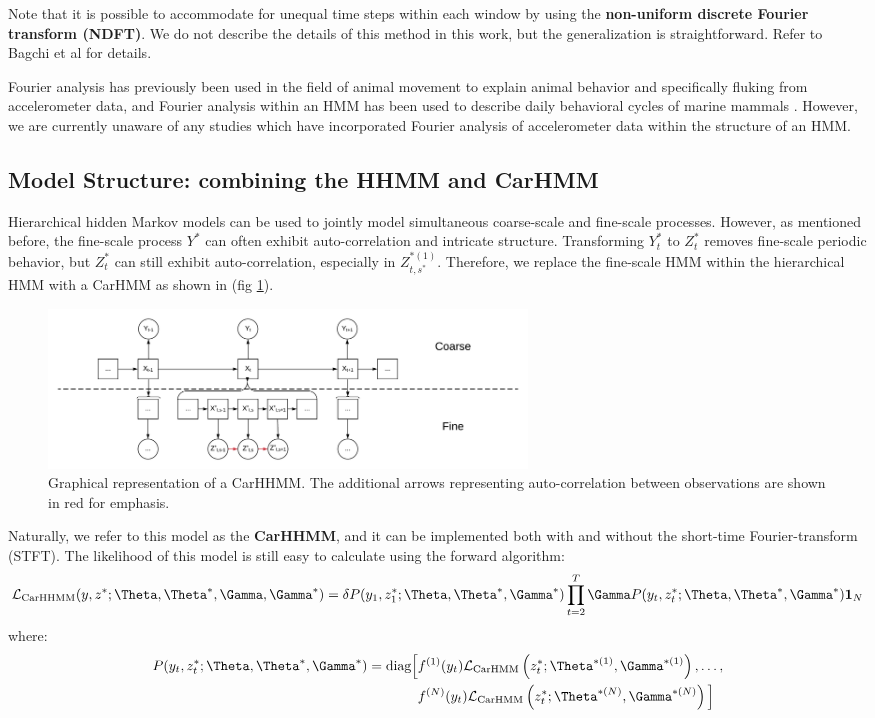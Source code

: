 Note that it is possible to accommodate for unequal time steps within each window by using the \textbf{non-uniform discrete Fourier transform (NDFT)}. We do not describe the details of this method in this work, but the generalization is straightforward. Refer to Bagchi et al \cite{Bagchi:2001} for details.

Fourier analysis has previously been used in the field of animal movement to explain animal behavior \cite{Fehlmann:2017} and specifically fluking \cite{Shorter:2017} from accelerometer data, and Fourier analysis within an HMM has been used to describe daily behavioral cycles of marine mammals  \cite{Heerah:2017}. However, we are currently unaware of any studies which have incorporated Fourier analysis of accelerometer data within the structure of an HMM.

\subsection{Model Structure: combining the HHMM and CarHMM}

Hierarchical hidden Markov models can be used to jointly model simultaneous coarse-scale and fine-scale processes. However, as mentioned before, the fine-scale process $Y^*$ can often exhibit auto-correlation and intricate structure. Transforming $Y^*_t$ to $Z^*_t$ removes fine-scale periodic behavior, but $Z^*_t$ can still exhibit auto-correlation, especially in $Z_{t,s^*}^{*(1)}$. Therefore, we replace the fine-scale HMM within the hierarchical HMM with a CarHMM as shown in (fig \ref{fig:CarHHMM}).
%
\begin{figure}[h!]
	\centering
	\includegraphics[width=5in]{../Plots/CarHHMM.png}
	\caption{Graphical representation of a CarHHMM. The additional arrows representing auto-correlation between observations are shown in red for emphasis.}
	\label{fig:CarHHMM}
\end{figure}
%
Naturally, we refer to this model as the \textbf{CarHHMM}, and it can be implemented both with and without the short-time Fourier-transform (STFT). The likelihood of this model is still easy to calculate using the forward algorithm:
%
$$\calL_{\text{CarHHMM}}(y,z^*;\Theta,\Theta^*,\Gamma,\Gamma^*) = \delta P(y_1,z_1^*;\Theta,\Theta^*,\Gamma^*) \prod_{t=2}^T \Gamma P(y_t,z_t^*;\Theta,\Theta^*,\Gamma^*) \mathbf{1}_N$$
%
where:
%
\begin{align*}
P(y_t,z_t^*;\Theta,\Theta^*,\Gamma^*)  = \text{diag}\Big[&f^{(1)}(y_t)\calL_{\text{CarHMM}}\left(z_t^*;\Theta^{*(1)},\Gamma^{*(1)}\right), \ldots , \\
&f^{(N)}(y_t)\calL_{\text{CarHMM}}\left(z_t^*;\Theta^{*(N)},\Gamma^{*(N)}\right) \Big]
\end{align*}
%